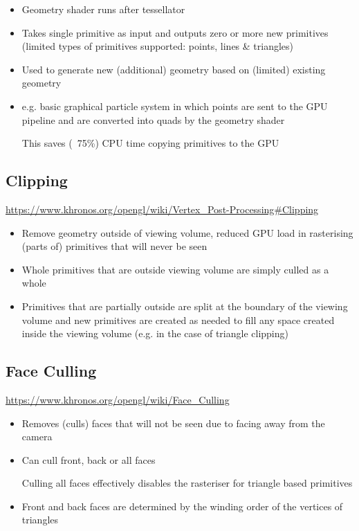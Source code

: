 \documentclass[a4paper]{article}
\begin{document}
\begin{itemize}
  \item
    Geometry shader runs after tessellator

  \item
    Takes single primitive as input and outputs zero or more new primitives
    (limited types of primitives supported: points, lines \& triangles)

  \item
    Used to generate new (additional) geometry based on (limited) existing
    geometry

  \item
    e.g. basic graphical particle system in which points are sent to the GPU
    pipeline and are converted into quads by the geometry shader

    This saves (~75\%) CPU time copying primitives to the GPU

\end{itemize}

\subsection{Clipping}

\url{https://www.khronos.org/opengl/wiki/Vertex_Post-Processing#Clipping}

\begin{itemize}
  \item
    Remove geometry outside of viewing volume, reduced GPU load in rasterising
    (parts of) primitives that will never be seen

  \item
    Whole primitives that are outside viewing volume are simply culled as a
    whole

  \item
    Primitives that are partially outside are split at the boundary of the
    viewing volume and new primitives are created as needed to fill any space
    created inside the viewing volume (e.g. in the case of triangle clipping)

\end{itemize}

\subsection{Face Culling}

\url{https://www.khronos.org/opengl/wiki/Face_Culling}

\begin{itemize}
  \item
    Removes (culls) faces that will not be seen due to facing away from the
    camera

  \item
    Can cull front, back or all faces

    Culling all faces effectively disables the rasteriser for triangle based
    primitives

  \item
    Front and back faces are determined by the winding order of the vertices of
    triangles

\end{itemize}
\end{document}
